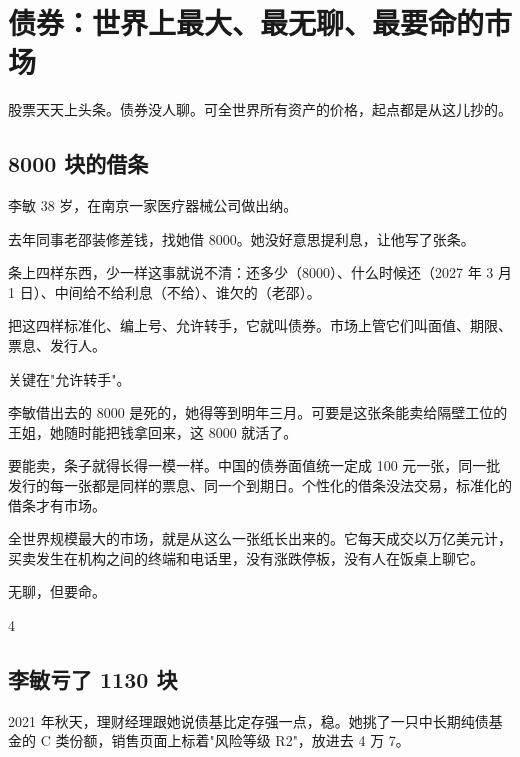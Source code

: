 \chapter{债券：世界上最大、最无聊、最要命的市场}

\begin{ledetext}
股票天天上头条。债券没人聊。可全世界所有资产的价格，起点都是从这儿抄的。
\end{ledetext}

\section{8000 块的借条}

李敏 38 岁，在南京一家医疗器械公司做出纳。

去年同事老邵装修差钱，找她借 8000。她没好意思提利息，让他写了张条。

条上四样东西，少一样这事就说不清：还多少（8000）、什么时候还（2027 年 3 月 1 日）、中间给不给利息（不给）、谁欠的（老邵）。

把这四样标准化、编上号、允许转手，它就叫债券。市场上管它们叫面值、期限、票息、发行人。

关键在"允许转手"。

李敏借出去的 8000 是死的，她得等到明年三月。可要是这张条能卖给隔壁工位的王姐，她随时能把钱拿回来，这 8000 就活了。

要能卖，条子就得长得一模一样。中国的债券面值统一定成 100 元一张，同一批发行的每一张都是同样的票息、同一个到期日。个性化的借条没法交易，标准化的借条才有市场。

全世界规模最大的市场，就是从这么一张纸长出来的。它每天成交以万亿美元计，买卖发生在机构之间的终端和电话里，没有涨跌停板，没有人在饭桌上聊它。

无聊，但要命。

\begin{statrow}{4}
\end{statrow}

\section{李敏亏了 1130 块}

2021 年秋天，理财经理跟她说债基比定存强一点，稳。她挑了一只中长期纯债基金的 C 类份额，销售页面上标着"风险等级 R2"，放进去 4 万 7。

